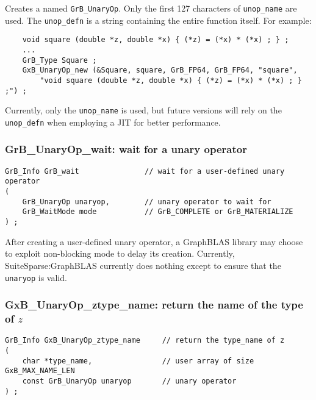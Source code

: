 \documentclass[12pt]{article}
\begin{document}
{Creates a named \verb'GrB_UnaryOp'.  Only the first 127 characters of
\verb'unop_name' are used.  The \verb'unop_defn' is a string containing the
entire function itself.  For example:

    {\footnotesize
    \begin{verbatim}
    void square (double *z, double *x) { (*z) = (*x) * (*x) ; } ;
    ...
    GrB_Type Square ;
    GxB_UnaryOp_new (&Square, square, GrB_FP64, GrB_FP64, "square",
        "void square (double *z, double *x) { (*z) = (*x) * (*x) ; } ;") ;
    \end{verbatim}}

Currently, only the \verb'unop_name' is used, but future versions will
rely on the \verb'unop_defn' when employing a JIT for better performance.

\subsubsection{{\sf GrB\_UnaryOp\_wait:} wait for a unary operator}
\label{unaryop_wait}

\begin{mdframed}[userdefinedwidth=6in]
{\footnotesize
\begin{verbatim}
GrB_Info GrB_wait               // wait for a user-defined unary operator
(
    GrB_UnaryOp unaryop,        // unary operator to wait for
    GrB_WaitMode mode           // GrB_COMPLETE or GrB_MATERIALIZE
) ;
\end{verbatim}
}\end{mdframed}

After creating a user-defined unary operator, a GraphBLAS library may choose to
exploit non-blocking mode to delay its creation.  Currently,
SuiteSparse:GraphBLAS currently does nothing except to ensure that the
\verb'unaryop' is valid.

\newpage
\subsubsection{{\sf GxB\_UnaryOp\_ztype\_name:} return the name of the type of $z$}
\label{unaryop_ztype_name}

\begin{mdframed}[userdefinedwidth=6in]
{\footnotesize
\begin{verbatim}
GrB_Info GxB_UnaryOp_ztype_name     // return the type_name of z
(
    char *type_name,                // user array of size GxB_MAX_NAME_LEN
    const GrB_UnaryOp unaryop       // unary operator
) ;
\end{verbatim}
}\end{mdframed}

}
\end{document}
